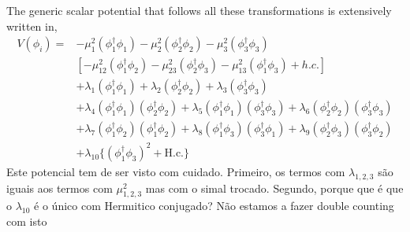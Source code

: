 The generic scalar potential that follows all these transformations is extensively written in, 
\begin{equation}
\label{eq:3HDM_Scalar_Pot}
\begin{split}
V(\phi_i) = & 
- \mu_1^2 \left( \phi^{\dagger}_1 \phi_1 \right) 
- \mu_2^2 \left( \phi^{\dagger}_2 \phi_2 \right)  
- \mu_3^2 \left( \phi^{\dagger}_3 \phi_3 \right) \\ 
& \left[ - \mu_{12}^2 \left( \phi^{\dagger}_1 \phi_2  \right) 
  - \mu_{23}^2 \left( \phi^{\dagger}_2 \phi_3  \right)  
  - \mu_{13}^2 \left( \phi^{\dagger}_1 \phi_3  \right) + h.c. \right]  \\
& + \lambda_1 \left( \phi^{\dagger}_1 \phi_1 \right) 
  + \lambda_2 \left( \phi^{\dagger}_2 \phi_2 \right)  
  + \lambda_3 \left( \phi^{\dagger}_3 \phi_3 \right) \\  
& + \lambda_4 \left( \phi^{\dagger}_1 \phi_1 \right)  \left( \phi^{\dagger}_2 \phi_2 \right) 
  + \lambda_5 \left( \phi^{\dagger}_1 \phi_1 \right)  \left( \phi^{\dagger}_3 \phi_3 \right)  
  + \lambda_6 \left( \phi^{\dagger}_2 \phi_2 \right)  \left( \phi^{\dagger}_3 \phi_3 \right)  \\ 
& + \lambda_7 \left( \phi^{\dagger}_1 \phi_2 \right)  \left( \phi^{\dagger}_1 \phi_2 \right)  
  + \lambda_8 \left( \phi^{\dagger}_1 \phi_3 \right)  \left( \phi^{\dagger}_3 \phi_1 \right)   
  + \lambda_9 \left( \phi^{\dagger}_2 \phi_3 \right)  \left( \phi^{\dagger}_3 \phi_2 \right)  \\
& + \lambda_{10} \Bigg\{ \left( \phi^{\dagger}_1 \phi_3 \right)^2 + \text{H.c.} \Bigg\}   
\end{split} 
\end{equation}
%
{ \color{red} Este potencial tem de ser visto com cuidado. Primeiro, os termos com $\lambda_{1,2,3}$ são iguais aos termos com $\mu^2_{1,2,3}$ mas com o simal trocado. Segundo, porque que é que o $\lambda_{10}$ é o único com Hermıitico conjugado? Não estamos a fazer double counting com isto} 


